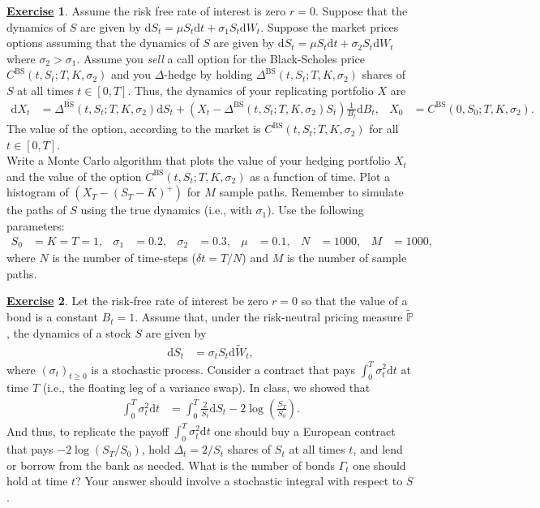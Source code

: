 \documentclass[12pt]{book}
\numberwithin{equation}{chapter}
\theoremstyle{plain}
\numberwithin{theorem}{section}
\theoremstyle{definition}
\newtheorem{exercise}{\underline{Exercise}}
\numberwithin{exercise}{chapter}
\newcommand{\<}{\langle}
\renewcommand{\>}{\rangle}
\renewcommand{\(}{\left(}
\renewcommand{\)}{\right)}
\renewcommand{\[}{\left[}
\renewcommand{\]}{\right]}
\newcommand\Pb{\mathds{P}}
\newcommand\sig{\sigma}
\newcommand\Gam{\Gamma}
\newcommand\del{\delta}
\newcommand\Del{\Delta}
\newcommand\Pbt{\widetilde{\Pb}}
\newcommand\Wt{\widetilde{W}}
\newcommand\dd{\mathrm{d}}
\newcommand\BS{\textrm{BS}}
\theoremstyle{definition}
\numberwithin{question}{section}
\begin{document}
\begin{exercise}
\label{exer:7-1}
Assume the risk free rate of interest is zero $r=0$.
Suppose that the dynamics of $S$ are given by $\dd S_t = \mu S_t \dd t + \sig_1 S_t \dd W_t$.  Suppose the market prices options assuming that the dynamics of $S$ are given by $\dd S_t = \mu S_t \dd t + \sig_2 S_t \dd W_t$ where $\sig_2 > \sig_1$.  Assume you \textit{sell} a call option for the Black-Scholes price $C^\BS(t,S_t;T,K,\sig_2)$ and you $\Del$-hedge by holding $\Del^\BS(t,S_t;T,K,\sig_2)$ shares of $S$ at all times $t \in [0,T]$.  Thus, the dynamics of your replicating portfolio $X$ are
\begin{align}
\dd X_t
	&=	\Del^\BS(t,S_t;T,K,\sig_2) \dd S_t + (X_t - \Del^\BS(t,S_t;T,K,\sig_2) S_t) \frac{1}{B_t} \dd B_t , &
X_0
	&=	C^\BS(0,S_0;T,K,\sig_2) .
\end{align}
The value of the option, according to the market is $C^\BS(t,S_t;T,K,\sig_2)$ for all $t \in [0,T]$.  \\
Write a Monte Carlo algorithm that plots the value of your hedging portfolio $X_t$ and the value of the option $C^\BS(t,S_t;T,K,\sig_2)$ as a function of time.  Plot a histogram of $(X_T - (S_T - K)^+)$ for $M$ sample paths.  
Remember to simulate the paths of $S$ using the true dynamics (i.e., with $\sig_1$).
Use the following parameters:
\begin{align}
S_0 & = K = T = 1, &
\sig_1
	&=	0.2 , &
\sig_2
	&=	0.3 , &
\mu
	&=	0.1 , &
N
	&=	1000, &
M
	&=	1000 ,
\end{align}
where $N$ is the number of time-steps ($\del t = T/N$) and $M$ is the number of sample paths.
\end{exercise}


\begin{exercise}
\label{exer:7-2}
Let the risk-free rate of interest be zero $r=0$ so that the value of a bond is a constant $B_t = 1$.
Assume that, under the risk-neutral pricing measure $\Pbt$, the dynamics of a stock $S$ are given by
\begin{align}
\dd S_t
	&=	\sig_t S_t \dd \Wt_t ,
\end{align}
where $(\sig_t)_{t \geq 0}$ is a stochastic process.  Consider a contract that pays $\int_0^T \sig_t^2 \dd t$ at time $T$ (i.e., the floating leg of a variance swap).  In class, we showed that
\begin{align}
\int_0^T \sig_t^2 \dd t
	&=	\int_0^T \frac{2}{S_t} \dd S_t - 2 \log \( \frac{S_T}{S_0} \) . \label{eq:RV}
\end{align}
And thus, to replicate the payoff $\int_0^T \sig_t^2 \dd t$ one should buy a European contract that pays $-2 \log ( S_T / S_0 )$, hold $\Del_t = 2/S_t$ shares of $S_t$ at all times $t$, and lend or borrow from the bank as needed.  What is the number of bonds $\Gam_t$ one should hold at time $t$?  Your answer should involve a stochastic integral with respect to $S$.
\end{exercise}
\end{document}
